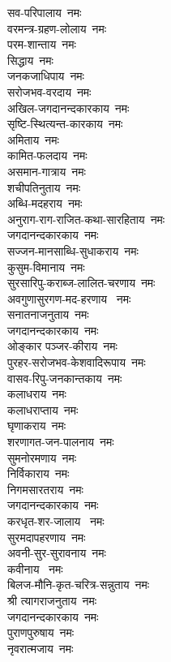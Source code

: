 \begin{flushleft}
\begin{multicols}{2}
सव-परिपालाय~नमः\hfill{}\\
वरमन्त्र-ग्रहण-लोलाय~नमः\\
परम-शान्ताय~नमः\\
सिद्धाय~नमः\\
जनकजाधिपाय~नमः\\
सरोजभव-वरदाय~नमः\\
अखिल-जगदानन्दकारकाय~नमः\\
सृष्टि-स्थित्यन्त-कारकाय~नमः\\
अमिताय~नमः\\
कामित-फलदाय~नमः\\
असमान-गात्राय~नमः\hfill{}\\
शचीपतिनुताय~नमः\\
अब्धि-मदहराय~नमः\\
अनुराग-राग-राजित-कथा-सारहिताय~नमः\\
जगदानन्दकारकाय~नमः\\
सज्जन-मानसाब्धि-सुधाकराय~नमः\\
कुसुम-विमानाय~नमः\\
सुरसारिपु-कराब्ज-लालित-चरणाय~नमः\\
अवगुणासुरगण-मद-हरणाय ~नमः\\
सनातनाजनुताय~नमः\\
जगदानन्दकारकाय~नमः\hfill{}\\
ओङ्कार पञ्जर-कीराय~नमः\\
पुरहर-सरोजभव-केशवादिरूपाय~नमः\\
वासव-रिपु-जनकान्तकाय~नमः\\
कलाधराय~नमः\\
कलाधराप्ताय~नमः\\
घृणाकराय~नमः\\
शरणागत-जन-पालनाय~नमः\\
सुमनोरमणाय~नमः\\
निर्विकाराय~नमः\\
निगमसारतराय~नमः\hfill{}\\
जगदानन्दकारकाय~नमः\\
करधृत-शर-जालाय ~नमः\\
सुरमदापहरणाय~नमः\\
अवनी-सुर-सुरावनाय~नमः\\
कवीनाय ~नमः\\
बिलज-मौनि-कृत-चरित्र-सन्नुताय~नमः\\
श्री त्यागराजनुताय~नमः\\
जगदानन्दकारकाय~नमः\\
पुराणपुरुषाय~नमः\\
नृवरात्मजाय~नमः\hfill{}\\

\end{multicols}
\end{flushleft}
